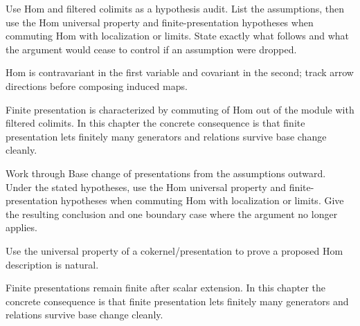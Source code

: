 \begin{exercise}\label{exr:v12-07}
Use Hom and filtered colimits as a hypothesis audit. List the assumptions, then use the Hom universal property and finite-presentation hypotheses when commuting Hom with localization or limits. State exactly what follows and what the argument would cease to control if an assumption were dropped.
\end{exercise}
\begin{hint}
Hom is contravariant in the first variable and covariant in the second; track arrow directions before composing induced maps.
\end{hint}
\begin{solution}
Finite presentation is characterized by commuting of Hom out of the module with filtered colimits. In this chapter the concrete consequence is that finite presentation lets finitely many generators and relations survive base change cleanly.
\end{solution}

\begin{exercise}\label{exr:v12-08}
Work through Base change of presentations from the assumptions outward. Under the stated hypotheses, use the Hom universal property and finite-presentation hypotheses when commuting Hom with localization or limits. Give the resulting conclusion and one boundary case where the argument no longer applies.
\end{exercise}
\begin{hint}
Use the universal property of a cokernel/presentation to prove a proposed Hom description is natural.
\end{hint}
\begin{solution}
Finite presentations remain finite after scalar extension. In this chapter the concrete consequence is that finite presentation lets finitely many generators and relations survive base change cleanly.
\end{solution}


